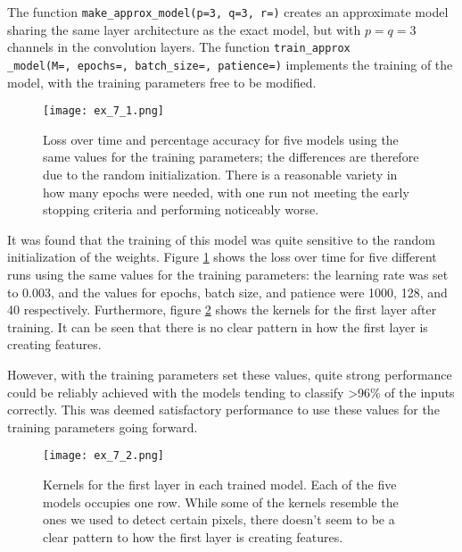 \documentclass{somasmsc}
\begin{document}
\newpage

\begin{exa}
The function \verb|make_approx_model(p=3, q=3, r=)| creates an approximate model sharing the same layer architecture as the exact model, but with $p=q=3$ channels in the convolution layers. The function \verb|train_approx|\\ \verb|_model(M=, epochs=, batch_size=, patience=)| implements the training of the model, with the training parameters free to be modified.

\begin{figure}[H]\label{digit:ex_7_1}
\begin{center}
\texttt{[image: ex\_7\_1.png]}
\end{center}
\caption{Loss over time and percentage accuracy for five models using the same values for the training parameters; the differences are therefore due to the random initialization. There is a reasonable variety in how many epochs were needed, with one run not meeting the early stopping criteria and performing noticeably worse.}
\end{figure}

It was found that the training of this model was quite sensitive to the random initialization of the weights. Figure \ref{digit:ex_7_1} shows the loss over time for five different runs using the same values for the training parameters: the learning rate was set to 0.003, and the values for epochs, batch size, and patience were 1000, 128, and 40 respectively. Furthermore, figure \ref{digit:ex_7_2} shows the kernels for the first layer after training. It can be seen that there is no clear pattern in how the first layer is creating features.

However, with the training parameters set these values, quite strong performance could be reliably achieved with the models tending to classify >96\% of the inputs correctly. This was deemed satisfactory performance to use these values for the training parameters going forward.

\begin{figure}[H]\label{digit:ex_7_2}
\begin{center}
\texttt{[image: ex\_7\_2.png]}
\end{center}
\caption{Kernels for the first layer in each trained model. Each of the five models occupies one row. While some of the kernels resemble the ones we used to detect certain pixels, there doesn't seem to be a clear pattern to how the first layer is creating features.}
\end{figure}
\end{exa}
\end{document}
